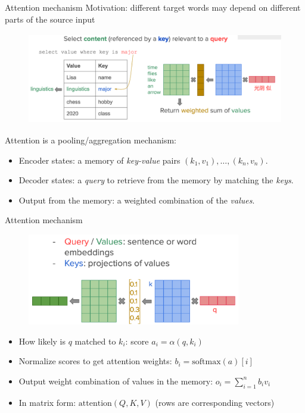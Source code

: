 \documentclass[usenames,dvipsnames,11pt,aspectratio=169]{beamer}
\begin{document}
\begin{frame}
    {Attention mechanism}
    Motivation: different target words may depend on different parts of the source input\\

    \vspace{-1em}
    \begin{figure}
        \includegraphics[height=4cm]{figures/attention}
    \end{figure}
    \vspace{-1em}
   
    Attention is a pooling/aggregation mechanism:\\
    \begin{itemize}
        \item Encoder states: a memory of \emph{key-value} pairs $(k_1, v_1), \ldots, (k_n, v_n)$.
        \item Decoder states: a \emph{query} to retrieve from the memory by matching the \emph{keys}.
        \item Output from the memory: a weighted combination of the \emph{values}.
    \end{itemize}
\end{frame}

\begin{frame}
    {Attention mechanism}
    \vspace{-1em}
    \begin{figure}
        \includegraphics[height=4cm]{figures/qkv}
    \end{figure}
    \vspace{-1em}

    \begin{itemize}
        \item How likely is $q$ matched to $k_i$: score $a_i = \alpha(q, k_i)$
        \item Normalize scores to get attention weights: $b_i = \text{softmax}(a)[i]$
        \item Output weight combination of values in the memory: $o_i = \sum_{i=1}^n b_i v_i$
        \item In matrix form: $\text{attention}(Q, K, V)$ (rows are corresponding vectors)
    \end{itemize}
\end{frame}
\end{document}
